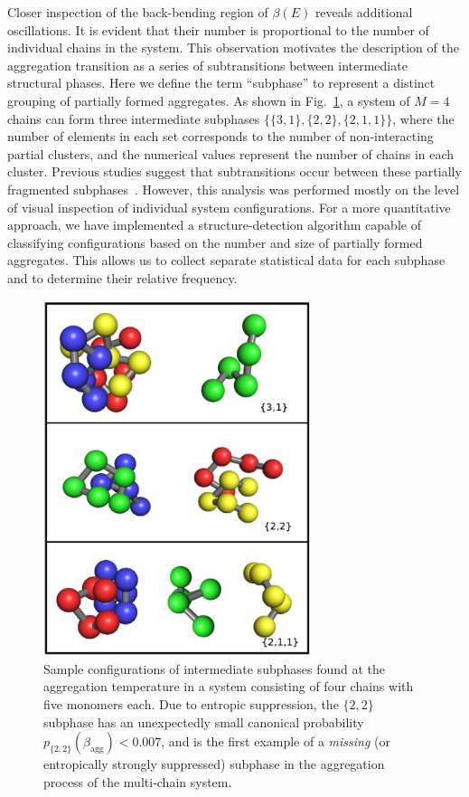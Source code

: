\documentclass[12pt]{report}
\begin{document}
Closer inspection of the back-bending region of $\beta (E)$ reveals 
additional oscillations. It is evident that their number is
proportional to the number of 
individual chains in the system. This observation motivates the description
of the aggregation transition as a series of subtransitions between
intermediate structural phases. Here we define the term ``subphase'' to
represent a distinct grouping of partially formed aggregates. As shown in
Fig.~\ref{fig:Fig_3}, a system of $M =4$ chains can form three intermediate
subphases $\{\{3,1\},\{2,2\},\{2,1,1\}\}$, where the number of elements in
each set corresponds to the number of non-interacting partial clusters, and
the numerical values represent the number of chains in each cluster.
Previous studies suggest that subtransitions occur between these partially 
fragmented subphases~\cite{jbj1,Junghans2008,Junghans2009,Junghans2011}.
However, this analysis was performed mostly on the level of 
visual inspection of individual system configurations. For a more
quantitative approach, we have implemented a structure-detection algorithm
capable of classifying configurations based on the number and size of
partially formed aggregates. This allows us to collect separate statistical
data for each subphase and to determine their relative frequency.
%
\begin{figure}
\center
\includegraphics[width = 0.7\textwidth]{chapter7Figs/configurations.eps}
\caption{\label{fig:Fig_3} Sample configurations of
intermediate subphases found at the aggregation temperature in a system
consisting of four chains with five monomers each. Due to entropic
suppression, the $\{2,2\}$ subphase has an unexpectedly small canonical
probability 
$p_{\{2,2\}}(\beta_{\mathrm{agg}}) < 0.007$, and is the first example of a
\textit{missing} (or entropically strongly suppressed) subphase in the
aggregation process of the multi-chain system.}
\end{figure}
\end{document}
